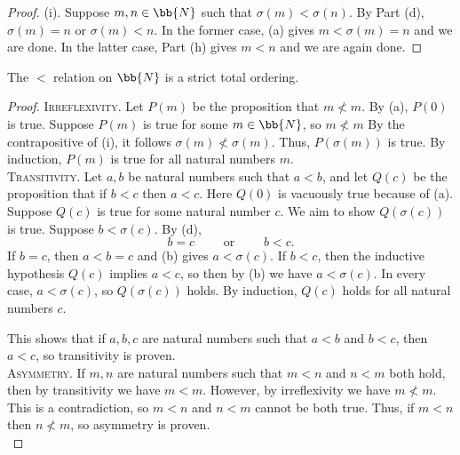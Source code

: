 \begin{proof}
	(i).
	Suppose $m, n\in\bb{N}$ such that $\sigma(m) < \sigma(n)$. 
	By Part (d), $\sigma(m) = n$ or $\sigma(m) < n$. 
	In the former case,  (a) gives $m < \sigma(m) = n$ and we are done. 
	In the latter case, Part (h) gives $m < n$ and we are again done. 
\end{proof}

\begin{theorem}
	The $<$ relation on $\bb{N}$ is a strict total ordering. 
\end{theorem}
\begin{proof}
	\textsc{Irreflexivity.}
	Let $P(m)$ be the proposition that $m\not< m$. 
	By  (a), $P(0)$ is true. 
	Suppose $P(m)$ is true for some $m\in\bb{N}$, so $m\not< m$
	By the contrapositive of  (i), it follows $\sigma(m) \not< \sigma(m)$. 
	Thus, $P(\sigma(m))$ is true.
	By induction, $P(m)$ is true for all natural numbers $m$. \\
	
	\textsc{Transitivity.}
	Let $a, b$ be natural numbers such that $a < b$, and let $Q(c)$ be the proposition that if $b < c$ then $a < c$. 
	Here $Q(0)$ is vacuously true because of  (a).
	Suppose $Q(c)$ is true for some natural number $c$.
	We aim to show $Q(\sigma(c))$ is true. 
	Suppose $b < \sigma(c)$. 
	By  (d), 
	\[ b = c \qquad\text{ or }\qquad b < c. \]
	If $b = c$, then $a < b = c$ and  (b) gives $a < \sigma(c)$. 
	If $b < c$, then the inductive hypothesis $Q(c)$ implies $a < c$, so then by  (b) we have $a < \sigma(c)$. 
	In every case, $a < \sigma(c)$, so $Q(\sigma(c))$ holds. 
	By induction, $Q(c)$ holds for all natural numbers $c$. 
	
	This shows that if $a, b, c$ are natural numbers such that $a < b$ and $b < c$, then $a < c$, so transitivity is proven. \\
	
	\textsc{Asymmetry.}
	If $m, n$ are natural numbers such that $m < n$ and $n < m$ both hold, then by transitivity we have $m < m$.
	However, by irreflexivity we have $m\not< m$.
	This is a contradiction, so $m < n$ and $n < m$ cannot be both true. 
	Thus, if $m < n$ then $n\not< m$, so asymmetry is proven. \\
	

\end{proof}
